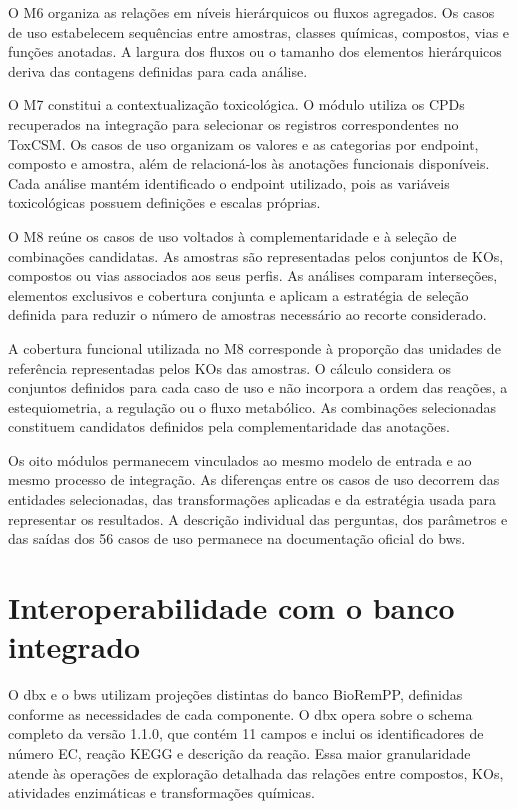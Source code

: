 O M6 organiza as relações em níveis hierárquicos ou fluxos agregados. Os casos
de uso estabelecem sequências entre amostras, classes químicas, compostos,
vias e funções anotadas. A largura dos fluxos ou o tamanho dos elementos
hierárquicos deriva das contagens definidas para cada análise.

O M7 constitui a contextualização toxicológica. O módulo utiliza os
CPDs recuperados na integração para selecionar os registros correspondentes
no ToxCSM. Os casos de uso organizam os valores e as categorias por endpoint,
composto e amostra, além de relacioná-los às anotações funcionais disponíveis.
Cada análise mantém identificado o endpoint utilizado, pois as variáveis
toxicológicas possuem definições e escalas próprias.

O M8 reúne os casos de uso voltados à complementaridade e à seleção de
combinações candidatas. As amostras são representadas pelos conjuntos de KOs,
compostos ou vias associados aos seus perfis. As análises comparam
interseções, elementos exclusivos e cobertura conjunta e aplicam a estratégia
de seleção definida para reduzir o número de amostras necessário ao recorte
considerado.

A cobertura funcional utilizada no M8 corresponde à proporção das unidades de
referência representadas pelos KOs das amostras. O cálculo considera os
conjuntos definidos para cada caso de uso e não incorpora a ordem das reações,
a estequiometria, a regulação ou o fluxo metabólico. As combinações
selecionadas constituem candidatos definidos pela complementaridade das
anotações.

Os oito módulos permanecem vinculados ao mesmo modelo de entrada e ao mesmo
processo de integração. As diferenças entre os casos de uso decorrem das
entidades selecionadas, das transformações aplicadas e da estratégia usada
para representar os resultados. A descrição individual das perguntas, dos
parâmetros e das saídas dos 56 casos de uso permanece na documentação oficial
do \gls{bws}.



\section{Interoperabilidade com o banco integrado}
\label{sec:c3-interop}

O \gls{dbx} e o \gls{bws} utilizam projeções distintas do banco BioRemPP,
definidas conforme as necessidades de cada componente. O \gls{dbx} opera sobre
o schema completo da versão 1.1.0, que contém 11 campos e inclui os
identificadores de número EC, reação KEGG e descrição da reação. Essa maior
granularidade atende às operações de exploração detalhada das relações entre
compostos, KOs, atividades enzimáticas e transformações químicas.

